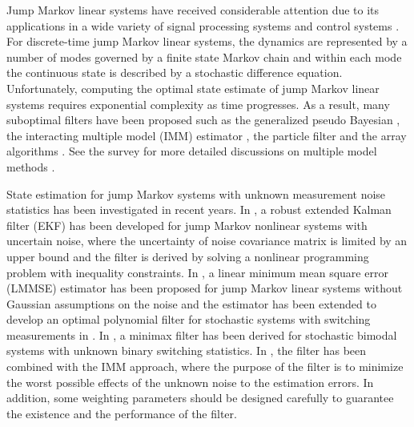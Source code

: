 \documentclass[12pt,draftcls,onecolumn]{IEEEtran}
\begin{document}
Jump Markov linear systems have received considerable attention due
to its applications in a wide variety of signal processing systems
and control systems \cite{2005mjls,book1,fd,train}. For
discrete-time jump Markov linear systems, the dynamics are
represented by a number of modes governed by a finite state Markov
chain and within each mode the continuous state is described by a
stochastic difference equation. Unfortunately, computing the optimal
state estimate of jump Markov linear systems requires exponential
complexity as time progresses. As a result, many suboptimal filters
have been proposed such as the generalized pseudo Bayesian
\cite{gpb}, the interacting multiple model (IMM) estimator
\cite{1988imm}, the particle filter
\cite{2000mmpf,2001ieeesp,2003immpf} and the array algorithms
\cite{2009ieeeacarray}. See the survey for more detailed discussions
on multiple model methods \cite{survey5}.



State estimation for jump Markov systems with unknown measurement
noise statistics has been investigated in recent years. In
\cite{2008rekfjmns}, a robust extended Kalman filter (EKF) has been
developed for jump Markov nonlinear systems with uncertain noise,
where the uncertainty of noise covariance matrix is limited by an
upper bound and the filter is derived by solving a nonlinear
programming problem with inequality constraints. In
\cite{1994taclmmse}, a linear minimum mean square error (LMMSE)
estimator has been proposed for jump Markov linear systems without
Gaussian assumptions on the noise and the estimator has been
extended to develop an optimal polynomial filter for stochastic
systems with switching measurements in \cite{2009germani}. In
\cite{2006ieeecs}, a minimax filter has been derived for stochastic
bimodal systems with unknown binary switching statistics. In
\cite{2010immhinf}, the  filter has been combined with the
IMM approach, where the purpose of the  filter is to
minimize the worst possible effects of the unknown noise to the
estimation errors. In addition, some weighting parameters should be
designed carefully to guarantee the existence and the performance of
the  filter.
\end{document}
